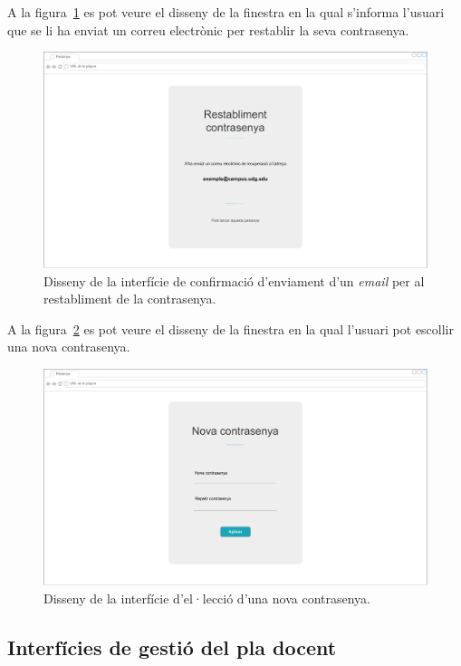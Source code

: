 \documentclass[a4paper,12pt]{ThesisStyle}
\begin{document}
A la figura~\ref{img:passwordRestablished} es pot veure el disseny de la finestra en la qual s'informa l'usuari que se li ha enviat un correu electrònic per restablir la seva contrasenya.
\begin{figure}[H]
	\centering
	\includegraphics[width=\textwidth]{assets/interfaces/auth/passwordRestablished.pdf}
	\caption{\label{img:passwordRestablished}Disseny de la interfície de confirmació d'enviament d'un \textit{email} per al restabliment de la contrasenya.}
\end{figure}

A la figura~\ref{img:newPassword} es pot veure el disseny de la finestra en la qual l'usuari pot escollir una nova contrasenya.
\begin{figure}[H]
	\centering
	\includegraphics[width=\textwidth]{assets/interfaces/auth/newPassword.pdf}
	\caption{\label{img:newPassword}Disseny de la interfície d'el·lecció d'una nova contrasenya.}
\end{figure}

\subsection{Interfícies de gestió del pla docent}
\label{subsec:interficies_plaDocent}
\end{document}
